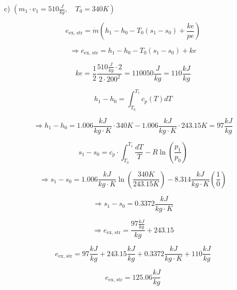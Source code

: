 c) $(m_1 \cdot v_1 = 510 \frac{J}{kg}, \quad T_0 = 340K)$


\[
e_{\text{ex, str}} = \dot{m} \left( h_1 - h_0 - T_0 (s_1 - s_0) + \frac{ke}{pe} \right)
\]

\[
\Rightarrow e_{\text{ex, str}} = h_1 - h_0 - T_0 (s_1 - s_0) + ke
\]

\[
ke = \frac{1}{2} \frac{510 \frac{J}{kg} \cdot 2}{2 \cdot 200^2} = 110050 \frac{J}{kg} = 110 \frac{kJ}{kg}
\]

\[
h_1 - h_0 = \int_{T_0}^{T_1} c_p(T) dT
\]

\[
\Rightarrow h_1 - h_0 = 1.006 \frac{kJ}{kg \cdot K} \cdot 340K - 1.006 \frac{kJ}{kg \cdot K} \cdot 243.15K = 97 \frac{kJ}{kg}
\]

\[
s_1 - s_0 = c_p \cdot \int_{T_0}^{T_1} \frac{dT}{T} - R \ln \left( \frac{p_1}{p_0} \right)
\]

\[
\Rightarrow s_1 - s_0 = 1.006 \frac{kJ}{kg \cdot K} \ln \left( \frac{340K}{243.15K} \right) - 8.314 \frac{kJ}{kg \cdot K} \left( \frac{1}{0} \right)
\]

\[
\Rightarrow s_1 - s_0 = 0.3372 \frac{kJ}{kg \cdot K}
\]

\[
\Rightarrow e_{\text{ex, str}} = \frac{97 \frac{kJ}{kg}}{kg} + 243.15
\]

\[
e_{\text{ex, str}} = 97 \frac{kJ}{kg} + 243.15 \frac{kJ}{kg} + 0.3372 \frac{kJ}{kg \cdot K} + 110 \frac{kJ}{kg}
\]

\[
e_{\text{ex, str}} = 125.06 \frac{kJ}{kg}
\]